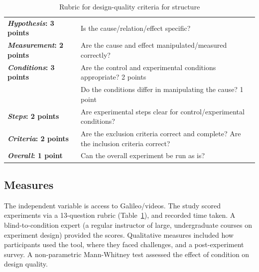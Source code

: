 \vspace{0.25in}
\begin{table}[!ht]
\caption[Rubric for design-quality criteria for structure]
{Rubric for design-quality criteria for structure}

\vspace{-0.25in}
\begin{center}
\begin{tabular}{p{1.75in}p{4.5in}}
\textbf{\textit{Hypothesis}: 3 points} & Is the cause/relation/effect specific?  \\
\textbf{\textit{Measurement}: 2 points} & Are the cause and effect manipulated/measured correctly? \\
\textbf{\textit{Conditions}: 3 points}  & Are the control and experimental conditions appropriate? 2 points \\
 & Do the conditions differ in manipulating the cause? 1 point \\
\textbf{\textit{Steps}: 2 points}  & Are experimental steps clear for control/experimental conditions?  \\
\textbf{\textit{Criteria}: 2 points} & Are the exclusion criteria correct and complete? Are the inclusion criteria correct? \\
\textbf{\textit{Overall}: 1 point} & Can the overall experiment be run as is?  \\
\end{tabular}
\end{center}
\label{tab:rubric1}
\end{table}

\subsection*{Measures}
The independent variable is access to Galileo/videos. The study scored experiments via a 13-question rubric (Table~\ref{tab:rubric1}), and recorded time taken. A blind-to-condition expert (a regular instructor of large, undergraduate courses on experiment design) provided the scores. Qualitative measures included how participants used the tool, where they faced challenges, and a post-experiment survey. A non-parametric Mann-Whitney test assessed the effect of condition on design quality. 

